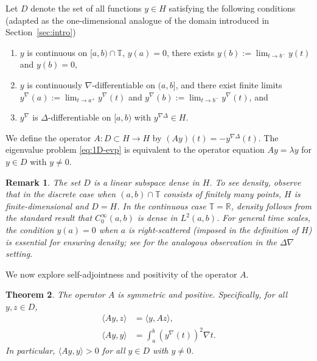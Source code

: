 \documentclass{article}
\newtheorem{theorem}{Theorem}[section]
\newtheorem{remark}[theorem]{Remark}
\numberwithin{equation}{section}
\numberwithin{theorem}{section}
\newcommand{\shalmalirmk}[1]{\textcolor{red}{\textsf{[Shalmali: #1]}}}
\begin{document}
Let $D$ denote the set of all functions $y \in H$ satisfying the following conditions (adapted as the one-dimensional analogue of the domain introduced in Section~\ref{sec:intro})
\begin{enumerate}
\item[(i)] $y$ is continuous on $[a,b)\cap\mathbb{T}$, $y(a) = 0$, there exists $y(b) := \displaystyle\lim_{t \to b^-} y(t)$ and $y(b) = 0$,
\item[(ii)] $y$ is continuously $\nabla$-differentiable on $(a,b]$, and there exist finite limits $y^\nabla(a) := \displaystyle\lim_{t \to a^+} y^\nabla(t)$ and $y^\nabla(b) := \displaystyle\lim_{t \to b^-} y^\nabla(t)$, and
\item[(iii)] $y^\nabla$ is $\Delta$-differentiable on $[a,b)$ with $y^{\nabla\Delta} \in H$.
\end{enumerate}

We define the operator $A\colon D \subset H \to H$ by $(Ay)(t) = -y^{\nabla\Delta}(t)$. The eigenvalue problem \eqref{eq:1D-evp} is equivalent to the operator equation $Ay = \lambda y$ for $y \in D$ with $y \neq 0$.

\begin{remark}\label{rem:D-dense}{\rm
The set $D$ is a linear subspace dense in $H$. To see density, observe that in the discrete case when $(a,b) \cap \mathbb{T}$ consists of finitely many points, $H$ is finite-dimensional and $D = H$. In the continuous case $\mathbb{T} = \mathbb{R}$, density follows from the standard result that $C_0^\infty(a,b)$ is dense in $L^2(a,b)$. For general time scales, the condition $y(a) = 0$ when $a$ is right-scattered (imposed in the definition of $H$) is essential for ensuring density; see \cite[Remark 3.4]{Guseinov-EF} for the analogous observation in the $\Delta\nabla$ setting.}
\end{remark}

We now explore self-adjointness and positivity of the operator $A$.

\begin{theorem}\label{thm:1D-self-adjoint}
The operator $A$ is symmetric and positive. Specifically, for all $y, z \in D$,
\begin{align}
\langle Ay, z \rangle &= \langle y, Az \rangle, \label{eq:1D-symmetric}\\
\langle Ay, y \rangle &= \int_a^b \left( y^\nabla(t) \right)^2 \nabla t. \label{eq:1D-positive}
\end{align}
In particular, $\langle Ay, y \rangle > 0$ for all $y \in D$ with $y \neq 0$.
\end{theorem}
\end{document}
